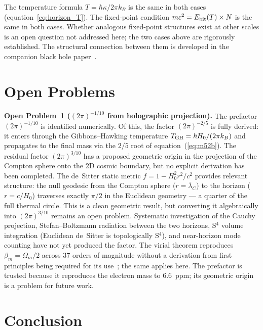 \documentclass[12pt,a4paper]{article}
\begin{document}
The temperature formula $T = \hbar\kappa/2\pi k_B$ is the same in both cases
(equation~\ref{eq:horizon_T}). The fixed-point condition $mc^2 = E_{\rm
bit}(T)\times N$ is the same in both cases. Whether analogous fixed-point
structures exist at other scales is an open question not addressed here; the two
cases above are rigorously established. The structural connection between them
is developed in the companion black hole paper~\cite{iam_bh}.

\section{Open Problems}
\label{sec:open}

\textbf{Open Problem~1 ($(2\pi)^{-1/10}$ from holographic projection).}
The prefactor $(2\pi)^{-1/10}$ is identified numerically. Of this, the factor
$(2\pi)^{-2/5}$ is fully derived: it enters through the Gibbons--Hawking
temperature $T_{\rm GH} = \hbar H_0/(2\pi k_B)$ and propagates to the final
mass via the $2/5$ root of equation~(\ref{eq:m52b}). The residual factor
$(2\pi)^{3/10}$ has a proposed geometric origin in the projection of the
Compton sphere onto the 2D cosmic boundary, but no explicit derivation has been
completed. The de~Sitter static metric $f = 1 - H_0^2 r^2/c^2$ provides
relevant structure: the null geodesic from the Compton sphere ($r = \bar\lambda_C$)
to the horizon ($r = c/H_0$) traverses exactly $\pi/2$ in the Euclidean
geometry --- a quarter of the full thermal circle. This is a clean geometric
result, but converting it algebraically into $(2\pi)^{3/10}$ remains an open
problem. Systematic investigation of the Cauchy projection, Stefan--Boltzmann
radiation between the two horizons, S$^4$ volume integration (Euclidean de~Sitter
is topologically S$^4$), and near-horizon mode counting have not yet produced
the factor. The virial theorem reproduces $\beta_m = \Omega_m/2$ across 37
orders of magnitude without a derivation from first principles being required
for its use~\cite{iam_virial}; the same applies here. The prefactor is
trusted because it reproduces the electron mass to 6.6~ppm; its geometric
origin is a problem for future work.

\section{Conclusion}
\end{document}
